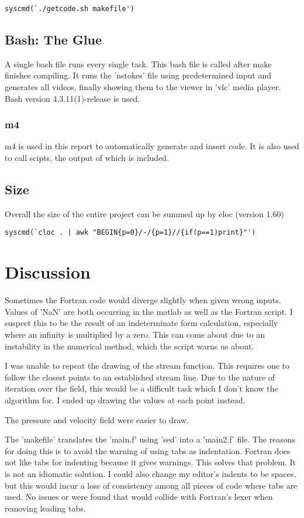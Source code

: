 \documentclass[listof=totoc]{report}
\begin{document}
\begin{verbatim}
syscmd(`./getcode.sh makefile')
\end{verbatim}

\section{Bash: The Glue}
A single bash file runs every single task. This bash file is called after make finishes compiling. It runs the 'nstokes' file using predetermined input and generates all videos, finally showing them to the viewer in 'vlc' media player.
Bash version 4.3.11(1)-release is used.

\subsection{m4}
m4 is used in this report to automatically generate and insert code. It is also used to call scipts, the output of which is included.

\section{Size}
Overall the size of the entire project can be summed up by cloc (version 1.60)
\begin{verbatim}
syscmd(`cloc . | awk "BEGIN{p=0}/-/{p=1}//{if(p==1)print}"')
\end{verbatim}

\chapter{Discussion}
Sometimes the Fortran code would diverge slightly when given wrong inputs. Values of 'NaN' are both occurring in the matlab as well as the Fortran script. I suspect this to be the result of an indeterminate form calculation, especially where an infinity is multiplied by a zero. This can come about due to an instability in the numerical method, which the script warns us about.

I was unable to repeat the drawing of the stream function. This requires one to follow the closest points to an established stream line. Due to the nature of iteration over the field, this would be a difficult task which I don't know the algorithm for. I ended up drawing the values at each point instead.

The pressure and velocity field were easier to draw.

The 'makefile' translates the 'main.f' using 'sed' into a 'main2.f' file. The reasons for doing this is to avoid the warning of using tabs as indentation. Fortran does not like tabs for indenting because it gives warnings. This solves that problem. It is not an idiomatic solution. I could also change my editor's indents to be spaces, but this would incur a loss of consistency among all pieces of code where tabs are used. No issues or were found that would collide with Fortran's lexer when removing leading tabs.
\end{document}
